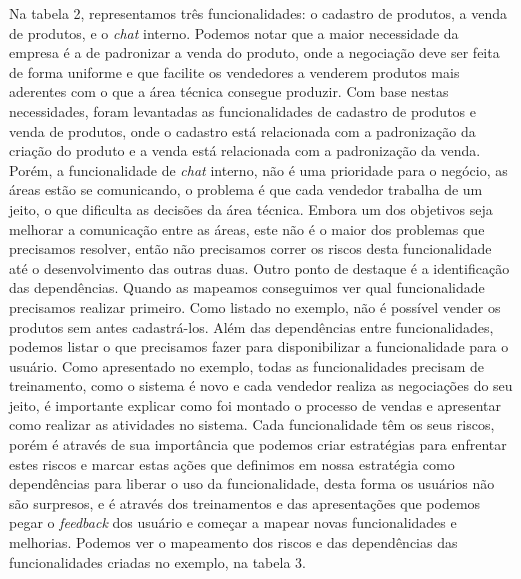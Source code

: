       Na tabela 2, representamos três funcionalidades: o cadastro de produtos,
      a venda de produtos, e o \textit{chat} interno. Podemos notar que a maior necessidade
      da empresa é a de padronizar a venda do produto, onde a negociação deve ser
      feita de forma uniforme e que facilite os vendedores a venderem produtos
      mais aderentes com o que a área técnica consegue produzir. Com base nestas
      necessidades, foram levantadas as funcionalidades de cadastro de produtos e
      venda de produtos, onde o cadastro está relacionada com a padronização da
      criação do produto e a venda está relacionada com a padronização da venda.
      Porém, a funcionalidade de \textit{chat} interno, não é uma prioridade para
      o negócio, as áreas estão se comunicando, o problema é que cada vendedor
      trabalha de um jeito, o que dificulta as decisões da área técnica. Embora um
      dos objetivos seja melhorar a comunicação entre as áreas, este não é o maior
      dos problemas que precisamos resolver, então não precisamos correr os riscos
      desta funcionalidade até o desenvolvimento das outras duas. \newline
      Outro ponto de destaque é a identificação das dependências. Quando as mapeamos
      conseguimos ver qual funcionalidade precisamos realizar primeiro. Como
      listado no exemplo, não é possível vender os produtos sem antes cadastrá-los.
      Além das dependências entre funcionalidades, podemos listar o que precisamos
      fazer para disponibilizar a funcionalidade para o usuário. Como apresentado
      no exemplo, todas as funcionalidades precisam de treinamento, como o sistema
      é novo e cada vendedor realiza as negociações do seu jeito, é importante
      explicar como foi montado o processo de vendas e apresentar como realizar
      as atividades no sistema. \newline
      Cada funcionalidade têm os seus riscos, porém é através de sua importância que
      podemos criar estratégias para enfrentar estes riscos e marcar estas ações
      que definimos em nossa estratégia como dependências para liberar o uso da
      funcionalidade, desta forma os usuários não são surpresos, e é através dos
      treinamentos e das apresentações que podemos pegar o \textit{feedback} dos
      usuário e começar a mapear novas funcionalidades e melhorias. Podemos ver
      o mapeamento dos riscos e das dependências das funcionalidades criadas no
      exemplo, na tabela 3. \newline

